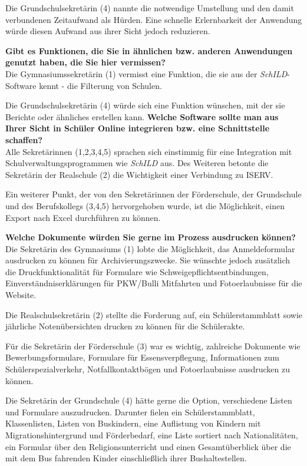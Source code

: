 Die Grundschulsekretärin (4) nannte die notwendige Umstellung und den damit verbundenen Zeitaufwand als Hürden. Eine schnelle Erlernbarkeit der Anwendung würde diesen Aufwand aus ihrer Sicht jedoch reduzieren.

\textbf{Gibt es Funktionen, die Sie in ähnlichen bzw. anderen Anwendungen genutzt haben, die Sie hier vermissen?}\\
Die Gymnasiumssekretärin (1) vermisst eine Funktion, die sie aus der \textit{SchILD}-Software kennt - die Filterung von Schulen.

Die Grundschulsekretärin (4) würde sich eine Funktion wünschen, mit der sie Berichte oder ähnliches erstellen kann.
\textbf{Welche Software sollte man aus Ihrer Sicht in Schüler Online integrieren bzw. eine Schnittstelle schaffen?}\\
Alle Sekretärinnen (1,2,3,4,5) sprachen sich einstimmig für eine Integration mit Schulverwaltungsprogrammen wie \textit{SchILD} aus. Des Weiteren betonte die Sekretärin der Realschule (2) die Wichtigkeit einer Verbindung zu ISERV.

Ein weiterer Punkt, der von den Sekretärinnen der Förderschule, der Grundschule und des Berufskollegs (3,4,5) hervorgehoben wurde, ist die Möglichkeit, einen Export nach Excel durchführen zu können.

\textbf{Welche Dokumente würden Sie gerne im Prozess ausdrucken können?}\\
Die Sekretärin des Gymnasiums (1) lobte die Möglichkeit, das Anmeldeformular ausdrucken zu können für Archivierungszwecke. Sie wünschte jedoch zusätzlich die Druckfunktionalität für Formulare wie Schweigepflichtsentbindungen, Einverständniserklärungen für PKW/Bulli Mitfahrten und Fotoerlaubnisse für die Website.

Die Realschulsekretärin (2) stellte die Forderung auf, ein Schülerstammblatt sowie jährliche Notenübersichten drucken zu können für die Schülerakte.

Für die Sekretärin der Förderschule (3) war es wichtig, zahlreiche Dokumente wie Bewerbungsformulare, Formulare für Essensverpflegung, Informationen zum Schülerspezialverkehr, Notfallkontaktbögen und Fotoerlaubnisse ausdrucken zu können.

Die Sekretärin der Grundschule (4) hätte gerne die Option, verschiedene Listen und Formulare auszudrucken. Darunter fielen ein Schülerstammblatt, Klassenlisten, Listen von Buskindern, eine Auflistung von Kindern mit Migrationshintergrund und Förderbedarf, eine Liste sortiert nach Nationalitäten, ein Formular über den Religionsunterricht und einen Gesamtüberblick über die mit dem Bus fahrenden Kinder einschließlich ihrer Bushaltestellen.


